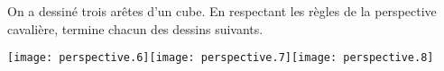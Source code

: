 On a dessiné trois arêtes d'un cube. En respectant les règles de la
perspective cavalière, termine chacun des dessins suivants.
\par
\texttt{[image: perspective.6]}\hfill\texttt{[image: perspective.7]}\hfill\texttt{[image: perspective.8]}
